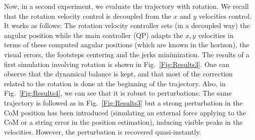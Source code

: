 Now, in a second experiment, we evaluate the trajectory with rotation. We recall that the rotation velocity control is decoupled from the $x$ and $y$ velocities control. It works as follows: The rotation velocity controller sets (in a decoupled way) the angular position while the main controller (QP) adapts the $x,y$ velocities in terms of these computed angular positions (which are known in the horizon), the visual errors, the footsteps centering and the jerks minimization. The results of a first simulation involving rotation is shown in Fig.~\ref{Fig:Results3}. One can observe that the dynamical balance is kept, and that most of the correction related to the rotation is done at the beginning of the trajectory. Also, in Fig.~\ref{Fig:Results4}, we can see that it is robust to perturbations: The same trajectory is followed as in Fig.~\ref{Fig:Results3} but a strong perturbation in the CoM position has been introduced (simulating an external force applying to the CoM or a string error in the position estimation), inducing visible peaks in the velocities. However, the perturbation is recovered quasi-instantly.

